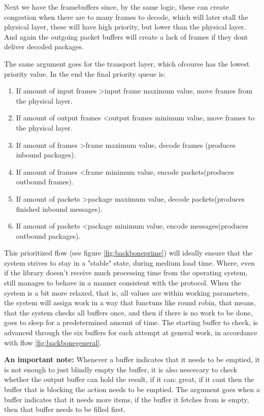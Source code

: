Next we have the framebuffers since, by the same logic, these can create congestion when there are to many frames to decode, which will later stall the physical layer, these will have high priority, but lower than the physical layer.
And again the outgoing packet buffers will create a lack of frames if they dont deliver decoded packages.

The same argument goes for the transport layer, which ofcourse has the lowest priority value.
 In the end the final priority queue is:

\begin{enumerate}
\item If amount of input frames \textgreater input frame maximum value, move frames from the physical layer.
\item If amount of output frames \textless output frames minimum value, move frames to the physical layer.
\item If amount of frames \textgreater frame maximum value, decode frames (produces inbound packages).
\item If amount of frames \textless frame minimum value, encode packets(produces outbound frames).
\item If amount of packets \textgreater package maximum value, decode packets(produces finished inbound messages).
\item If amount of packets \textless package minimum value, encode messages(produces outbound packages).
\end{enumerate}
This prioritized flow (see figure \ref{fig:backboneprime}) will ideally ensure that the system strives to stay in a "stable" state, during medium load time. Where, even if the library doesn't receive much processing time from the operating system, still manages to behave in a manner consistent with the protocol.
When the system is a bit more relaxed, that is, all values are within working parameters, the system will assign work in a way that functuns like round robin, that means, that the system checks all buffers once, and then if there is no work to be done, goes to sleep for a predetermined amount of time. The starting buffer to check, is advanced through the six buffers for each attempt at general work, in accordance with flow \ref{fig:backbonegeneral}.




\textbf{An important note:}
Whenever a buffer indicates that it needs to be emptied, it is not enough to just blindly empty the buffer, it is also nescecary to check whether the output buffer can hold the result, if it can: great, if it cant then the buffer that is blocking the action needs to be emptied.
The argument goes when a buffer indicates that it needs more items, if the buffer it fetches from is empty, then that buffer needs to be filled first.



